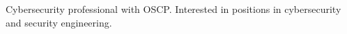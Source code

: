 

\begin{cvparagraph}

Cybersecurity professional with OSCP. Interested in positions in cybersecurity and security engineering.

\end{cvparagraph}

